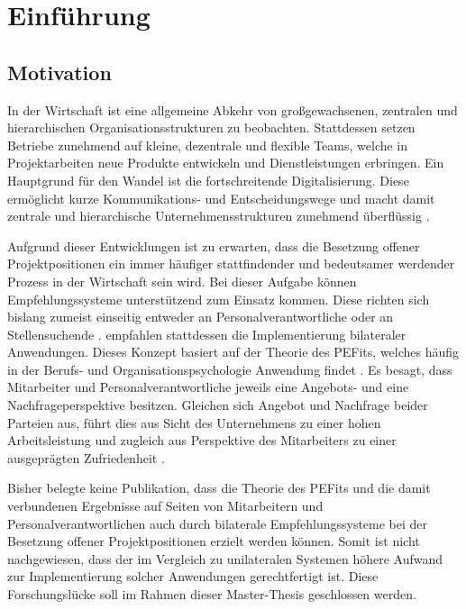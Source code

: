 \chapter{Einführung}
\label{ch:intro}

\section{Motivation}
\label{sec:intro:motivation}
In der Wirtschaft ist eine allgemeine Abkehr von großgewachsenen, zentralen und hierarchischen Organisationsstrukturen zu beobachten. Stattdessen setzen Betriebe zunehmend auf kleine, dezentrale und flexible Teams, welche in Projektarbeiten neue Produkte entwickeln und Dienstleistungen erbringen. Ein Hauptgrund für den Wandel ist die fortschreitende Digitalisierung. Diese ermöglicht kurze Kommunikations- und Entscheidungswege und macht damit zentrale und hierarchische Unternehmensstrukturen zunehmend überflüssig \cite[S. 2ff.]{elanceEconomy:1999}.

Aufgrund dieser Entwicklungen ist zu erwarten, dass die Besetzung offener Projektpositionen ein immer häufiger stattfindender und bedeutsamer werdender Prozess in der Wirtschaft sein wird. Bei dieser Aufgabe können Empfehlungssysteme unterstützend zum Einsatz kommen. Diese richten sich bislang zumeist einseitig entweder an Personalverantwortliche oder an Stellensuchende \cite[S. 2f.]{siting:2012}. \textcite[S. 1ff.]{malinowski:2006} empfahlen stattdessen die Implementierung bilateraler Anwendungen. Dieses Konzept basiert auf der Theorie des \aclp{PEFit}, welches häufig in der Berufs- und Organisationspsychologie Anwendung findet \cite[S. 2]{guan:2021}. Es besagt, dass Mitarbeiter und Personalverantwortliche jeweils eine Angebots- und eine Nachfrageperspektive besitzen. Gleichen sich Angebot und Nachfrage beider Parteien aus, führt dies aus Sicht des Unternehmens zu einer hohen Arbeitsleistung und zugleich aus Perspektive des Mitarbeiters zu einer ausgeprägten Zufriedenheit \cite[S. 6]{su:2015}.

Bisher belegte keine Publikation, dass die Theorie des \aclp{PEFit} und die damit verbundenen Ergebnisse auf Seiten von Mitarbeitern und Personalverantwortlichen auch durch bilaterale Empfehlungssysteme bei der Besetzung offener Projektpositionen erzielt werden können. Somit ist nicht nachgewiesen, dass der im Vergleich zu unilateralen Systemen höhere Aufwand zur Implementierung solcher Anwendungen gerechtfertigt ist. Diese Forschungslücke soll im Rahmen dieser Master-Thesis geschlossen werden.

